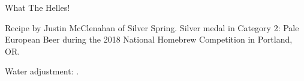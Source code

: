 \begin{recipe}{What The Helles!} %

\begin{aboutblock}
Recipe by Justin McClenahan of Silver Spring. Silver medal in Category 2: Pale
European Beer during the 2018 National Homebrew Competition in Portland, OR.
\sourceaha
\end{aboutblock}


\begin{methodandtiming}

\begin{mashsteps}
\end{mashsteps}

\begin{fermentationsteps}
\end{fermentationsteps}

\begin{directions}
Water adjustment: .
\end{directions}

\end{methodandtiming}

\recipebreak

\begin{ingredientsblock}

\begin{malts}
\end{malts}

\begin{hops}
\end{hops}


\end{ingredientsblock}

\end{recipe}
